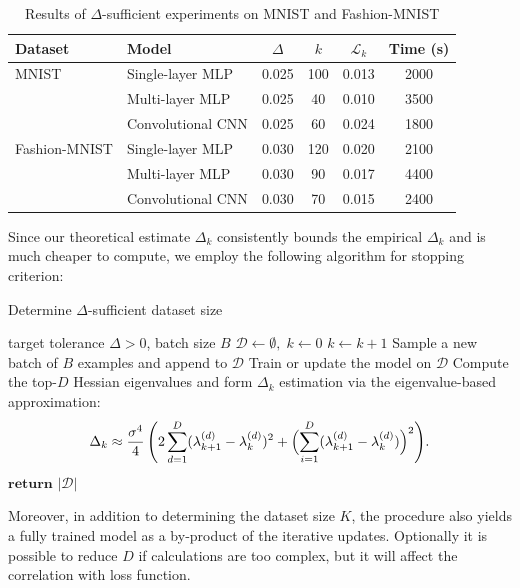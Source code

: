 \documentclass{article}
\begin{document}
\begin{table}[ht]
  \centering
  \caption{Results of $\Delta$-sufficient experiments on MNIST and Fashion-MNIST}\label{tab:results}
  \begin{tabular}{llcccc}
    \toprule
    Dataset       & Model             & $\Delta$ & $k$ & $\mathcal{L}_k$ & Time (s) \\
    \midrule
    MNIST         & Single-layer MLP  & 0.025    & 100 & 0.013           & 2000     \\
                  & Multi-layer MLP   & 0.025    & 40  & 0.010           & 3500     \\
                  & Convolutional CNN & 0.025    & 60  & 0.024           & 1800     \\
    \midrule
    Fashion-MNIST & Single-layer MLP  & 0.030    & 120 & 0.020           & 2100     \\
                  & Multi-layer MLP   & 0.030    & 90  & 0.017           & 4400     \\
                  & Convolutional CNN & 0.030    & 70  & 0.015           & 2400     \\
    \bottomrule
  \end{tabular}
\end{table}

Since our theoretical estimate $\Delta_k$ consistently bounds the
empirical $\Delta_k$ and is much cheaper to compute, we employ the following algorithm for stopping criterion:

\begin{algorithm}[H]
  \caption{Determine $\Delta$-sufficient dataset size}\label{alg:algo}
  \begin{algorithmic}[1]
    \Require target tolerance $\Delta>0$, batch size $B$
    \State $\mathcal{D}\gets \emptyset,\;k\gets 0$
    \Repeat
    \State $k\gets k+1$
    \State Sample a new batch of $B$ examples and append to $\mathcal{D}$
    \State Train or update the model on $\mathcal{D}$
    \State Compute the top-$D$ Hessian eigenvalues and form
    $\Delta_k$ estimation via the eigenvalue-based approximation:
    $$
      \Delta_k \approx
      \frac{\sigma^4}{4}\, \Biggl( 2 \sum_{d=1}^D (\lambda_{k+1}^{(d)} - \lambda_k^{(d)})^2
      + \Bigl( \sum_{i=1}^D (\lambda_{k+1}^{(d)} - \lambda_k^{(d)}) \Bigr)^2 \Biggr).
    $$
    \State $\textbf{return }|\mathcal{D}|$
  \end{algorithmic}
\end{algorithm}

Moreover, in addition to determining the dataset size $K$, the procedure also yields a fully trained model as a by‐product of the
iterative updates. Optionally it is possible to reduce $D$ if calculations are too complex, but it will affect the correlation with loss
function.
\end{document}
